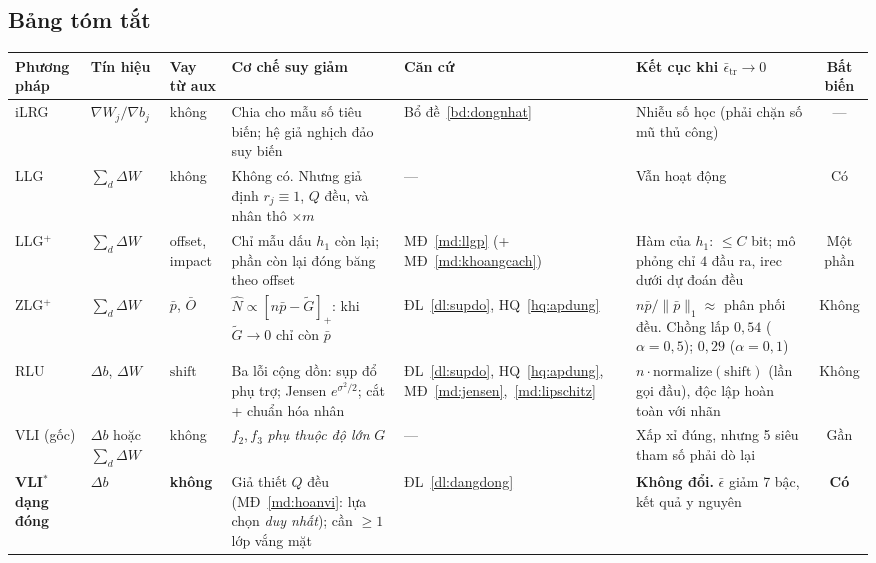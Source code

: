 \documentclass[11pt]{article}
\theoremstyle{remark}
\begin{document}
\begin{landscape}
\section{Bảng tóm tắt}
\label{sec:bang}

\footnotesize
\noindent
\begin{tabular}{@{}l l l p{3.8cm} l p{3.8cm} c@{}}
\toprule
\textbf{Phương pháp} & \textbf{Tín hiệu} & \textbf{Vay từ aux} &
\textbf{Cơ chế suy giảm} & \textbf{Căn cứ} &
\textbf{Kết cục khi $\bar\epsilon_{\mathrm{tr}}\to0$} & \textbf{Bất biến} \\
\midrule
iLRG & $\nabla W_j/\nabla b_j$ & không &
Chia cho mẫu số tiêu biến; hệ giả nghịch đảo suy biến &
Bổ đề~\ref{bd:dongnhat} &
Nhiễu số học (phải chặn số mũ thủ công) & --- \\

LLG & $\sum_d \Delta W$ & không &
Không có. Nhưng giả định $r_j\equiv1$, $Q$ đều, và nhân thô $\times m$ &
--- & Vẫn hoạt động & Có \\

LLG$^+$ & $\sum_d \Delta W$ & offset, impact &
Chỉ mẫu dấu $h_1$ còn lại; phần còn lại đóng băng theo offset &
MĐ~\ref{md:llgp} (+ MĐ~\ref{md:khoangcach}) &
Hàm của $h_1$: $\le C$ bit; mô phỏng chỉ $4$ đầu ra, irec dưới dự đoán đều & Một phần \\

ZLG$^+$ & $\sum_d \Delta W$ & $\bar p$, $\bar O$ &
$\widehat N\propto[n\bar p-\tilde G]_+$: khi $\tilde G\to0$ chỉ còn $\bar p$ &
ĐL~\ref{dl:supdo}, HQ~\ref{hq:apdung} &
$n\bar p/\|\bar p\|_1\approx$ phân phối đều. Chồng lấp $0{,}54$ ($\alpha{=}0{,}5$); $0{,}29$ ($\alpha{=}0{,}1$) & Không \\

RLU & $\Delta b$, $\Delta W$ & $\mathrm{shift}$ &
Ba lỗi cộng dồn: sụp đổ phụ trợ; Jensen $e^{\sigma^2/2}$; cắt + chuẩn hóa nhân &
ĐL~\ref{dl:supdo}, HQ~\ref{hq:apdung}, MĐ~\ref{md:jensen},~\ref{md:lipschitz} &
$n\cdot\text{normalize}(\mathrm{shift})$ (lần gọi đầu), độc lập hoàn toàn với nhãn & Không \\
\midrule
VLI (gốc) & $\Delta b$ hoặc $\sum_d\Delta W$ & không &
$f_2,f_3$ \emph{phụ thuộc độ lớn} $G$ & --- &
Xấp xỉ đúng, nhưng 5 siêu tham số phải dò lại & Gần \\

\textbf{VLI}$^*$ \textbf{dạng đóng} & $\Delta b$ & \textbf{không} &
Giả thiết $Q$ đều (MĐ~\ref{md:hoanvi}: lựa chọn \emph{duy nhất}); cần $\ge1$ lớp vắng mặt &
ĐL~\ref{dl:dangdong} &
\textbf{Không đổi.} $\bar\epsilon$ giảm 7 bậc, kết quả y nguyên & \textbf{Có} \\


\end{tabular}
\end{landscape}
\end{document}
